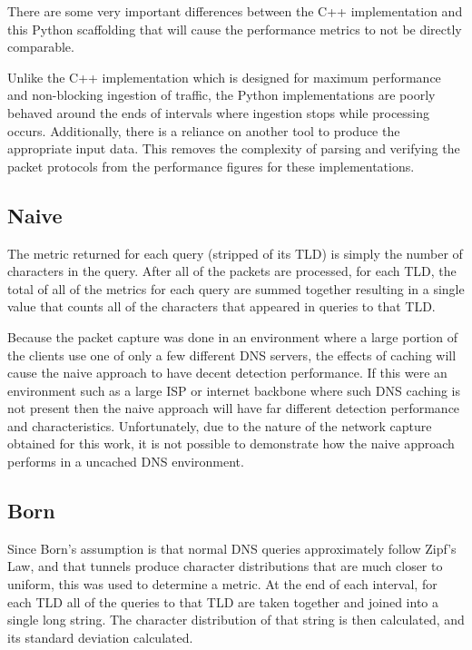 \documentclass[12pt]{report}
\theoremstyle{remark}
\theoremstyle{definition}
\theoremstyle{definition}
\theoremstyle{definition}
\begin{document}
There are some very important differences between the C++ implementation and
this Python scaffolding that will cause the performance metrics to not be
directly comparable.

Unlike the C++ implementation which is designed for maximum performance and
non-blocking ingestion of traffic, the Python implementations are poorly behaved
around the ends of intervals where ingestion stops while processing occurs.
Additionally, there is a reliance on another tool to produce the appropriate 
input data. This removes the complexity of
parsing and verifying the packet protocols from the performance figures for
these implementations.

\subsection{Naive}
The metric returned for each query (stripped of its TLD) is simply the number of
characters in the query. After all of the packets are processed, for each TLD,
the total of all of the metrics for each query are summed together resulting in
a single value that counts all of the characters that appeared in queries to
that TLD.

Because the packet capture was done in an environment where a large portion of
the clients use one of only a few different DNS servers, the effects of caching
will cause the naive approach to have decent detection performance. If this were
an environment such as a large ISP or internet backbone where such DNS caching
is not present then the naive approach will have far different detection
performance and characteristics. Unfortunately, due to the nature of the network
capture obtained for this work, it is not possible to demonstrate how the naive
approach performs in a uncached DNS environment.

\subsection{Born}

Since Born's\cite{Born2010.cfa} assumption is that normal DNS queries
approximately follow Zipf's Law, and that tunnels produce character
distributions that are much closer to uniform, this was used to determine a
metric. At the end of each interval, for each TLD all of the queries to that TLD
are taken together and joined into a single long string. The character
distribution of that string is then calculated, and its standard deviation
calculated.
\end{document}
